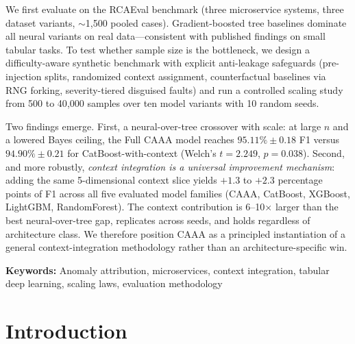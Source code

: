\documentclass[12pt,a4paper]{report}
\newcommand{\sys}{CAAA}
\begin{document}
We first evaluate on the RCAEval benchmark (three microservice systems,
three dataset variants, $\sim$1{,}500 pooled cases). Gradient-boosted
tree baselines dominate all neural variants on real data---consistent
with published findings on small tabular tasks. To test whether sample
size is the bottleneck, we design a difficulty-aware synthetic benchmark
with explicit anti-leakage safeguards (pre-injection splits, randomized
context assignment, counterfactual baselines via RNG forking,
severity-tiered disguised faults) and run a controlled scaling study
from 500 to 40{,}000 samples over ten model variants with 10 random seeds.

Two findings emerge. First, a neural-over-tree crossover with scale:
at large $n$ and a lowered Bayes ceiling, the Full \sys{} model reaches
$95.11\% \pm 0.18$ F1 versus $94.90\% \pm 0.21$ for CatBoost-with-context
(Welch's $t = 2.249$, $p = 0.038$). Second, and more robustly,
\emph{context integration is a universal improvement mechanism}:
adding the same 5-dimensional context slice yields $+1.3$ to $+2.3$
percentage points of F1 across all five evaluated model families
(CAAA, CatBoost, XGBoost, LightGBM, RandomForest). The context
contribution is 6--10$\times$ larger than the best neural-over-tree gap,
replicates across seeds, and holds regardless of architecture class.
We therefore position \sys{} as a principled instantiation of a general
context-integration methodology rather than an architecture-specific win.

\vspace{0.5cm}
\noindent\textbf{Keywords:} Anomaly attribution, microservices, context
integration, tabular deep learning, scaling laws, evaluation methodology

\newpage
\tableofcontents

\newpage
\listoffigures
{}

\newpage
\listoftables
{}


\chapter{Introduction}
\end{document}
